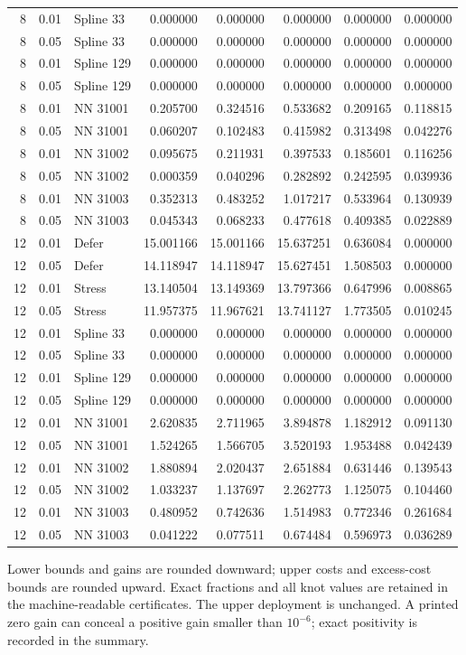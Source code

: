 \begin{longtable}{rrlrrrrr}
8 & 0.01 & Spline 33 & 0.000000 & 0.000000 & 0.000000 & 0.000000 & 0.000000 \\
8 & 0.05 & Spline 33 & 0.000000 & 0.000000 & 0.000000 & 0.000000 & 0.000000 \\
8 & 0.01 & Spline 129 & 0.000000 & 0.000000 & 0.000000 & 0.000000 & 0.000000 \\
8 & 0.05 & Spline 129 & 0.000000 & 0.000000 & 0.000000 & 0.000000 & 0.000000 \\
8 & 0.01 & NN 31001 & 0.205700 & 0.324516 & 0.533682 & 0.209165 & 0.118815 \\
8 & 0.05 & NN 31001 & 0.060207 & 0.102483 & 0.415982 & 0.313498 & 0.042276 \\
8 & 0.01 & NN 31002 & 0.095675 & 0.211931 & 0.397533 & 0.185601 & 0.116256 \\
8 & 0.05 & NN 31002 & 0.000359 & 0.040296 & 0.282892 & 0.242595 & 0.039936 \\
8 & 0.01 & NN 31003 & 0.352313 & 0.483252 & 1.017217 & 0.533964 & 0.130939 \\
8 & 0.05 & NN 31003 & 0.045343 & 0.068233 & 0.477618 & 0.409385 & 0.022889 \\
12 & 0.01 & Defer & 15.001166 & 15.001166 & 15.637251 & 0.636084 & 0.000000 \\
12 & 0.05 & Defer & 14.118947 & 14.118947 & 15.627451 & 1.508503 & 0.000000 \\
12 & 0.01 & Stress & 13.140504 & 13.149369 & 13.797366 & 0.647996 & 0.008865 \\
12 & 0.05 & Stress & 11.957375 & 11.967621 & 13.741127 & 1.773505 & 0.010245 \\
12 & 0.01 & Spline 33 & 0.000000 & 0.000000 & 0.000000 & 0.000000 & 0.000000 \\
12 & 0.05 & Spline 33 & 0.000000 & 0.000000 & 0.000000 & 0.000000 & 0.000000 \\
12 & 0.01 & Spline 129 & 0.000000 & 0.000000 & 0.000000 & 0.000000 & 0.000000 \\
12 & 0.05 & Spline 129 & 0.000000 & 0.000000 & 0.000000 & 0.000000 & 0.000000 \\
12 & 0.01 & NN 31001 & 2.620835 & 2.711965 & 3.894878 & 1.182912 & 0.091130 \\
12 & 0.05 & NN 31001 & 1.524265 & 1.566705 & 3.520193 & 1.953488 & 0.042439 \\
12 & 0.01 & NN 31002 & 1.880894 & 2.020437 & 2.651884 & 0.631446 & 0.139543 \\
12 & 0.05 & NN 31002 & 1.033237 & 1.137697 & 2.262773 & 1.125075 & 0.104460 \\
12 & 0.01 & NN 31003 & 0.480952 & 0.742636 & 1.514983 & 0.772346 & 0.261684 \\
12 & 0.05 & NN 31003 & 0.041222 & 0.077511 & 0.674484 & 0.596973 & 0.036289 \\
\bottomrule
\end{longtable}
\endgroup
Lower bounds and gains are rounded downward; upper costs and excess-cost bounds are rounded upward. Exact fractions and all knot values are retained in the machine-readable certificates. The upper deployment is unchanged. A printed zero gain can conceal a positive gain smaller than $10^{-6}$; exact positivity is recorded in the summary.
